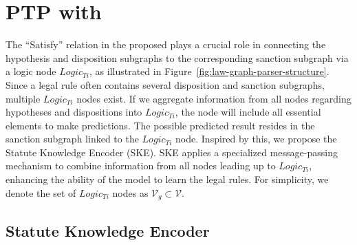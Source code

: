 


\section{PTP with }
The ``Satisfy'' relation in the proposed  plays a crucial role in connecting the hypothesis and disposition subgraphs to the corresponding sanction subgraph via a logic node $Logic_{Ti}$, as illustrated in Figure~\ref{fig:law-graph-parser-structure}. Since a legal rule often contains several disposition and sanction subgraphs, multiple $Logic_{Ti}$ nodes exist. If we aggregate information from all nodes regarding hypotheses and dispositions into $Logic_{Ti}$, the node will include all essential elements to make predictions. The possible predicted result resides in the sanction subgraph linked to the $Logic_{Ti}$ node. 
Inspired by this, we propose the Statute Knowledge Encoder (SKE). SKE applies a specialized message-passing mechanism to combine information from all nodes leading up to $Logic_{Ti}$, enhancing the ability of the model to learn the legal rules. For simplicity, we denote the set of  $Logic_{Ti}$ nodes as $\mathcal{V}_g\subset \mathcal{V}$.

\subsection{Statute Knowledge Encoder} \label{lea}



